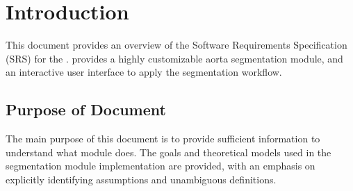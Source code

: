 \documentclass[12pt]{article}
\begin{document}





\section{Introduction}

This document provides an overview of the Software Requirements Specification
(SRS) for the \progname{}. \progname{}
provides a highly customizable aorta segmentation module, 
and an interactive user interface to apply the segmentation workflow.


\subsection{Purpose of Document}
The main purpose of this document is to provide sufficient information to
understand what \progname{} module does. The goals and theoretical models used in the
\progname{} segmentation module implementation are provided,
with an emphasis on explicitly identifying assumptions and unambiguous
definitions.
\end{document}
